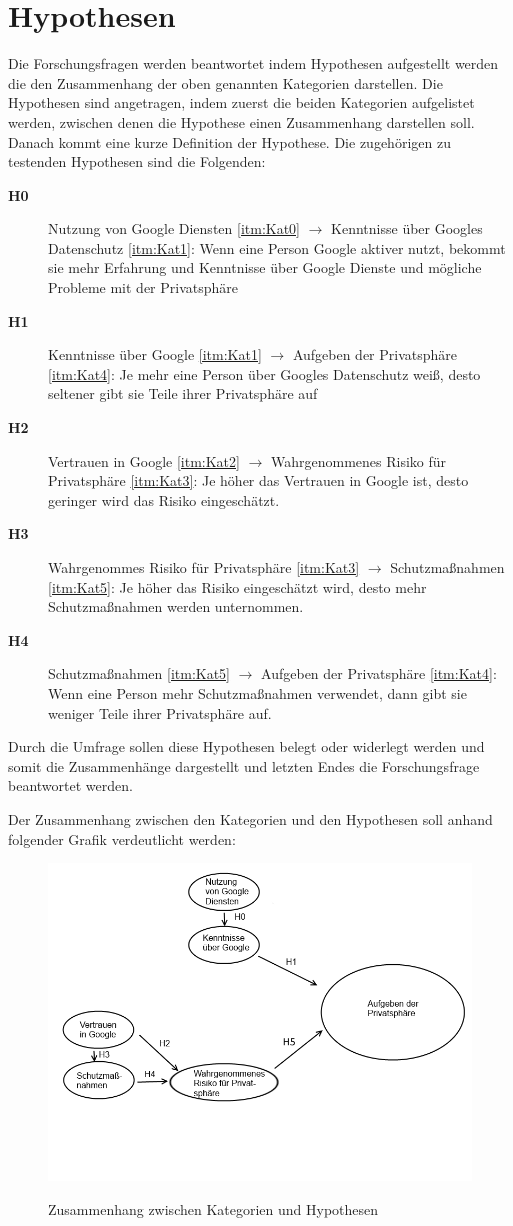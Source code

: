 \section{Hypothesen}
Die Forschungsfragen werden beantwortet indem Hypothesen aufgestellt werden die den Zusammenhang der oben genannten Kategorien darstellen.
Die Hypothesen sind angetragen, indem zuerst die beiden Kategorien aufgelistet werden, zwischen denen die Hypothese einen Zusammenhang darstellen soll. Danach kommt eine kurze Definition der Hypothese.
Die zugehörigen zu testenden Hypothesen sind die Folgenden:
\begin{description}
\item[\label{itm:H0}\textbf{H0}] Nutzung von Google Diensten \ref{itm:Kat0} $\rightarrow$ Kenntnisse über Googles Datenschutz \ref{itm:Kat1}: Wenn eine Person Google aktiver nutzt, bekommt sie mehr Erfahrung und Kenntnisse über Google Dienste und mögliche Probleme mit der Privatsphäre
\item[\label{itm:H1}\textbf{H1}] Kenntnisse über Google \ref{itm:Kat1} $\rightarrow$ Aufgeben der Privatsphäre \ref{itm:Kat4}: Je mehr eine Person über Googles Datenschutz weiß, desto seltener gibt sie Teile ihrer Privatsphäre auf
\item[\label{itm:H2}\textbf{H2}] Vertrauen in Google \ref{itm:Kat2} $\rightarrow$ Wahrgenommenes Risiko für Privatsphäre \ref{itm:Kat3}: Je höher das Vertrauen in Google ist, desto geringer wird das Risiko eingeschätzt.
\item[\label{itm:H3}\textbf{H3}] Wahrgenommes Risiko für Privatsphäre \ref{itm:Kat3} $\rightarrow$ Schutzmaßnahmen \ref{itm:Kat5}: Je höher das Risiko eingeschätzt wird, desto mehr Schutzmaßnahmen werden unternommen.
\item[\label{itm:H4}\textbf{H4}] Schutzmaßnahmen \ref{itm:Kat5} $\rightarrow$ Aufgeben der Privatsphäre \ref{itm:Kat4}: Wenn eine Person mehr Schutzmaßnahmen verwendet, dann gibt sie weniger Teile ihrer Privatsphäre auf.
\end{description}
Durch die Umfrage sollen diese Hypothesen belegt oder widerlegt werden und somit die Zusammenhänge dargestellt und letzten Endes die Forschungsfrage beantwortet werden.

Der Zusammenhang zwischen den Kategorien und den Hypothesen soll anhand folgender Grafik verdeutlicht werden:
\begin{figure}[H]
\centering
\includegraphics[scale=0.55]{images/bubbles}\\
\caption{Zusammenhang zwischen Kategorien und Hypothesen}\label{bubbles}
\end{figure}